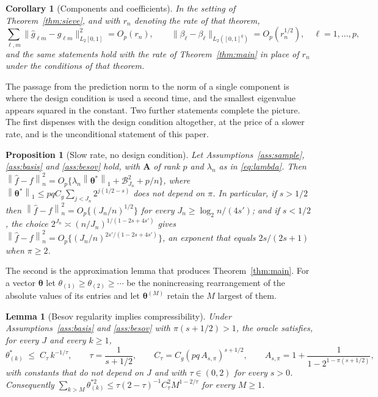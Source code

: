 \documentclass[12pt]{article} %
\newtheorem{lemma}{Lemma}
\newtheorem{corollary}{Corollary}
\newtheorem{proposition}{Proposition}
\theoremstyle{definition}
\newcommand{\norm}[1]{\left\lVert #1 \right\rVert}
\newcommand{\normn}[1]{\left\lVert #1 \right\rVert_{n}}
\newcommand{\cv}{\ell}
\newcommand{\md}{m}
\newcommand{\lev}{j}
\newcommand{\fcoef}[1]{\beta_{#1}}
\newcommand{\gcomp}[2]{g_{#1#2}}
\newcommand{\btheta}{\boldsymbol{\theta}}
\newcommand{\thetastar}{\btheta^{*}}
\newcommand{\penn}{\lambda_{n}}
\newcommand{\seff}{s'}
\newcommand{\Amat}{\mathbf{A}}
\begin{document}
\begin{corollary}[Components and coefficients]
\label{cor:components}
In the setting of Theorem~\ref{thm:sieve}, and with $r_n$ denoting the rate of
that theorem,
\[
  \sum_{\cv,\md}\bigl\lVert\widehat{g}_{\cv\md}-\gcomp{\cv}{\md}
  \bigr\rVert_{L_2[0,1]}^{2} = O_p(r_n),
  \qquad
  \bigl\lVert\widehat{\fcoef{\cv}}-\fcoef{\cv}
  \bigr\rVert_{L_2([0,1]^{q})} = O_p(r_n^{1/2}),
  \quad \cv = 1,\dots,p,
\]
and the same statements hold with the rate of Theorem~\ref{thm:main} in place
of $r_n$ under the conditions of that theorem.
\end{corollary}

The passage from the prediction norm to the norm of a single component is
where the design condition is used a second time, and the smallest eigenvalue
appears squared in the constant. Two further statements complete the picture.
The first dispenses with the design condition altogether, at the price of a
slower rate, and is the unconditional statement of this paper.

\begin{proposition}[Slow rate, no design condition]
\label{prop:slow}
Let Assumptions~\ref{ass:sample}, \ref{ass:basis} and \ref{ass:besov} hold,
with $\Amat$ of rank $p$ and $\penn$ as in \eqref{eq:lambda}. Then
$\normn{\widehat{f}-f}^{2} = O_p\{\penn\norm{\thetastar}_{1} +
\mathcal{B}_{J_n}^{2} + p/n\}$, where
$\norm{\thetastar}_{1} \le pqC_g\sum_{\lev<J_n}2^{\lev(1/2-s)}$ does not
depend on $\pi$. In particular, if $s > 1/2$ then
$\normn{\widehat{f}-f}^{2} = O_p\{(J_n/n)^{1/2}\}$ for every
$J_n \ge \log_2 n/(4\seff)$; and if $s < 1/2$, the choice
$2^{J_n} \asymp (n/J_n)^{1/(1-2s+4\seff)}$ gives
$\normn{\widehat{f}-f}^{2} = O_p\{(J_n/n)^{2\seff/(1-2s+4\seff)}\}$, an
exponent that equals $2s/(2s+1)$ when $\pi \ge 2$.
\end{proposition}

The second is the approximation lemma that produces Theorem~\ref{thm:main}.
For a vector $\btheta$ let $\theta_{(1)} \ge \theta_{(2)} \ge \cdots$ be the
nonincreasing rearrangement of the absolute values of its entries and let
$\btheta^{(M)}$ retain the $M$ largest of them.

\begin{lemma}[Besov regularity implies compressibility]
\label{lem:weak}
Under Assumptions~\ref{ass:basis} and \ref{ass:besov} with
$\pi(s+1/2) > 1$, the \textcolor{colR1}{oracle} satisfies, for every $J$ and every
$k \ge 1$,
\[
  \theta^{*}_{(k)} \;\le\; C_\tau\,k^{-1/\tau},
  \qquad \tau = \frac{1}{s+1/2},
  \qquad C_\tau = C_g(pq\,A_{s,\pi})^{s+1/2},
  \qquad A_{s,\pi} = 1 + \frac{1}{1-2^{1-\pi(s+1/2)}},
\]
with constants that do not depend on $J$ and with $\tau \in (0,2)$ for every
$s > 0$. Consequently
$\sum_{k>M}\theta^{*2}_{(k)} \le \tau(2-\tau)^{-1}C_\tau^{2}M^{1-2/\tau}$ for
every $M \ge 1$.
\end{lemma}
\end{document}
